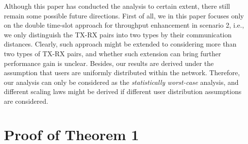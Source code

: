 \documentclass[journal,draftclsnofoot,onecolumn,12pt,twoside]{IEEEtran}
\begin{document}
Although this paper has conducted the analysis to certain extent, there still remain some possible future directions. First of all, we in this paper focuses only on the double time-slot approach for throughput enhancement in scenario 2, i.e., we only distinguish the TX-RX pairs into two types by their communication distances. Clearly, such approach might be extended to considering more than two types of TX-RX pairs, and whether such extension can bring further performance gain is unclear. Besides, our results are derived under the assumption that users are uniformly distributed within the network. Therefore, our analysis can only be considered as the {\em statistically worst-case} analysis, and different scaling laws might be derived if different user distribution assumptions are considered.

\appendices

\section{Proof of Theorem 1}
\label{App:ProofThm1}
\end{document}
